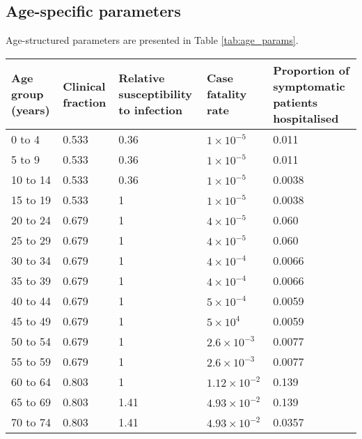 \subsection{Age-specific parameters}
Age-structured parameters are presented in Table \ref{tab:age_params}.

\begin{table}
    \begin{threeparttable}
    \begin{tabularx}{\textwidth}{| X | X | X | X | X |}
        \hline
        Age group (years) & Clinical fraction\tnote{a} & 
        Relative susceptibility to infection & Case fatality rate & 
        Proportion of symptomatic patients hospitalised \\
        \hline
        0 to 4 & 0.533 & 0.36 & $1\times10^{-5}$ & 0.011 \\
        \hline
        5 to 9 & 0.533 & 0.36 & $1\times10^{-5}$ & 0.011 \\
        \hline
        10 to 14 & 0.533 & 0.36 & $1\times10^{-5}$ & 0.0038 \\
        \hline
        15 to 19 & 0.533 & 1 & $1\times10^{-5}$ & 0.0038 \\
        \hline
        20 to 24 & 0.679 & 1 & $4\times10^{-5}$ & 0.060 \\
        \hline
        25 to 29 & 0.679 & 1 & $4\times10^{-5}$ & 0.060 \\
        \hline
        30 to 34 & 0.679 & 1 & $4\times10^{-4}$ & 0.0066 \\
        \hline
        35 to 39 & 0.679 & 1 & $4\times10^{-4}$ & 0.0066 \\
        \hline
        40 to 44 & 0.679 & 1 & $5\times10^{-4}$ & 0.0059 \\
        \hline
        45 to 49 & 0.679 & 1 & $5\times10^{4}$ & 0.0059 \\
        \hline
        50 to 54 & 0.679 & 1 & $2.6\times10^{-3}$ & 0.0077 \\
        \hline
        55 to 59 & 0.679 & 1 & $2.6\times10^{-3}$ & 0.0077 \\
        \hline
        60 to 64 & 0.803 & 1 & $1.12\times10^{-2}$ & 0.139 \\
        \hline
        65 to 69 & 0.803 & 1.41 & $4.93\times10^{-2}$ & 0.139 \\
        \hline
        70 to 74 & 0.803 & 1.41 & $4.93\times10^{-2}$ & 0.0357 \\

\end{tabularx}
\end{threeparttable}
\end{table}
